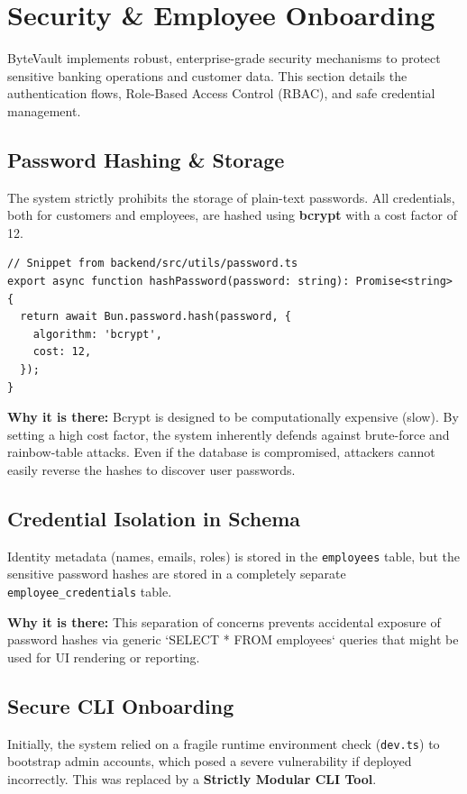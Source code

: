 \section{Security \& Employee Onboarding}

ByteVault implements robust, enterprise-grade security mechanisms to protect sensitive banking operations and customer data. This section details the authentication flows, Role-Based Access Control (RBAC), and safe credential management.

\subsection{Password Hashing \& Storage}
The system strictly prohibits the storage of plain-text passwords. All credentials, both for customers and employees, are hashed using \textbf{bcrypt} with a cost factor of 12.

\begin{lstlisting}[style=typescript]
// Snippet from backend/src/utils/password.ts
export async function hashPassword(password: string): Promise<string> {
  return await Bun.password.hash(password, {
    algorithm: 'bcrypt',
    cost: 12,
  });
}
\end{lstlisting}

\textbf{Why it is there:} Bcrypt is designed to be computationally expensive (slow). By setting a high cost factor, the system inherently defends against brute-force and rainbow-table attacks. Even if the database is compromised, attackers cannot easily reverse the hashes to discover user passwords.

\subsection{Credential Isolation in Schema}
Identity metadata (names, emails, roles) is stored in the \texttt{employees} table, but the sensitive password hashes are stored in a completely separate \texttt{employee\_credentials} table.

\textbf{Why it is there:} This separation of concerns prevents accidental exposure of password hashes via generic `SELECT * FROM employees` queries that might be used for UI rendering or reporting.

\subsection{Secure CLI Onboarding}
Initially, the system relied on a fragile runtime environment check (\texttt{dev.ts}) to bootstrap admin accounts, which posed a severe vulnerability if deployed incorrectly. This was replaced by a \textbf{Strictly Modular CLI Tool}.


